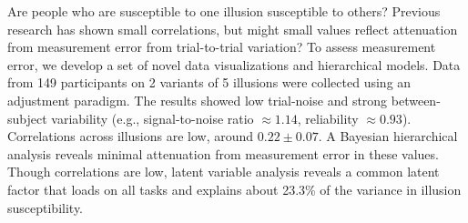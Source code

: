Are people who are susceptible to one illusion susceptible to others? Previous research has shown small correlations, but might small values reflect attenuation from measurement error from trial-to-trial variation?  To assess measurement error, we develop a set of novel data visualizations and hierarchical models.  Data from 149 participants on 2 variants of 5 illusions were collected using an adjustment paradigm. The results showed low trial-noise and strong between-subject variability (e.g., signal-to-noise ratio $\approx 1.14$, reliability $\approx 0.93$). Correlations across illusions are low, around $0.22 \pm 0.07$. A Bayesian hierarchical analysis reveals minimal attenuation from measurement error in these values. Though correlations are low, latent variable analysis reveals a common latent factor that loads on all tasks and explains about 23.3\% of the variance in illusion susceptibility.